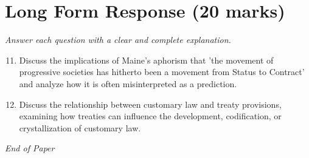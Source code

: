 \documentclass[12pt]{article}
\begin{document}
\section*{Long Form Response (20 marks)}
\textit{Answer each question with a clear and complete explanation.}
\begin{enumerate}[label=\arabic*.]
\setcounter{enumi}{10}
\item Discuss the implications of Maine's aphorism that 'the movement of progressive societies has hitherto been a movement from Status to Contract' and analyze how it is often misinterpreted as a prediction.
\item Discuss the relationship between customary law and treaty provisions, examining how treaties can influence the development, codification, or crystallization of customary law.
\end{enumerate}

\vfill
\noindent\textit{End of Paper}
\end{document}

